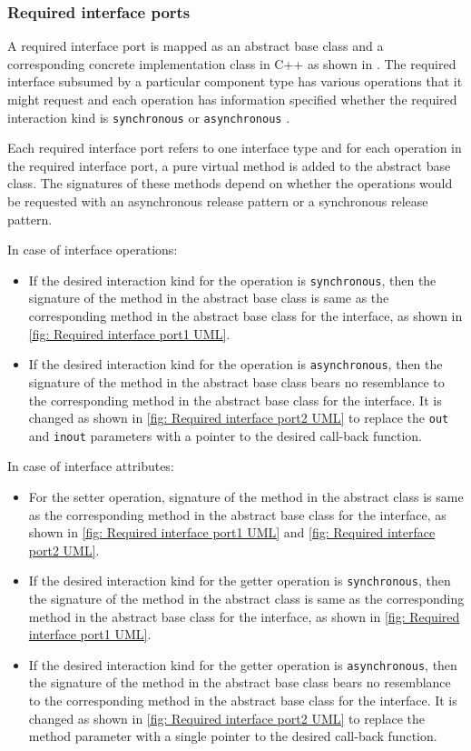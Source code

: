\subsubsection{\textbf{Required interface ports}}
A required interface port is mapped as an abstract base class and a corresponding concrete implementation class in C++ as shown in \cite{EvoRAVCodeAr}. The required interface subsumed by a particular component type has various operations that it might request and each operation has information specified whether the required interaction kind is \texttt{synchronous} or \texttt{asynchronous} \cite{SpecMetamodel}\cite{CompBasedProcess}. 

Each required interface port refers to one interface type and for each operation in the required interface port, a pure virtual method is added to the abstract base class. The signatures of these methods depend on whether the operations would be requested with an asynchronous release pattern or a synchronous release pattern.

In case of interface operations:
\begin{itemize}
\item If the desired interaction kind for the operation is \texttt{synchronous}, then the signature of the method in the abstract base class is same as the corresponding method in the abstract base class for the interface, as shown in \cref{fig: Required interface port1 UML}.
\item If the desired interaction kind for the operation is \texttt{asynchronous}, then the signature of the method in the abstract base class bears no resemblance to the corresponding method in the abstract base class for the interface. It is changed as shown in \cref{fig: Required interface port2 UML} to replace the \texttt{out} and \texttt{inout} parameters with a pointer to the desired call-back function. 
\end{itemize}

In case of interface attributes:
\begin{itemize}
\item For the setter operation, signature of the method in the abstract class is same as the corresponding method in the abstract base class for the interface, as shown in \cref{fig: Required interface port1 UML} and \cref{fig: Required interface port2 UML}.
\item If the desired interaction kind for the getter operation is \texttt{synchronous}, then the signature of the method in the abstract class is same as the corresponding method in the abstract base class for the interface, as shown in \cref{fig: Required interface port1 UML}. 
\item If the desired interaction kind for the getter operation is \texttt{asynchronous}, then the signature of the method in the abstract base class bears no resemblance to the corresponding method in the abstract base class for the interface. It is changed as shown in \cref{fig: Required interface port2 UML} to replace the method parameter with a single pointer to the desired call-back function.  
\end{itemize} 

